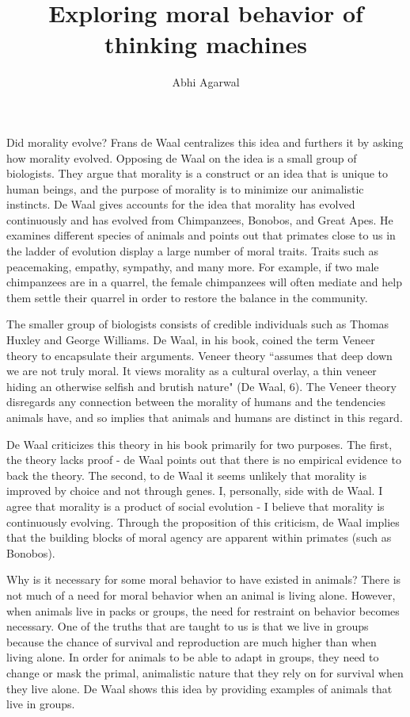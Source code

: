 \documentclass[11pt, oneside]{article}
\title{Exploring moral behavior of thinking machines}
\author{Abhi Agarwal}
\date{}
\begin{document}
\maketitle

\par Did morality evolve? Frans de Waal centralizes this idea and furthers it by asking how morality evolved. Opposing de Waal on the idea is a small group of biologists. They argue that morality is a construct or an idea that is unique to human beings, and the purpose of morality is to minimize our animalistic instincts. De Waal gives accounts for the idea that morality has evolved continuously and has evolved from Chimpanzees, Bonobos, and Great Apes. He examines different species of animals and points out that primates close to us in the ladder of evolution display a large number of moral traits. Traits such as peacemaking, empathy, sympathy, and many more. For example, if two male chimpanzees are in a quarrel, the female chimpanzees will often mediate and help them settle their quarrel in order to restore the balance in the community.
 
\par The smaller group of biologists consists of credible individuals such as Thomas Huxley and George Williams. De Waal, in his book, coined the term Veneer theory to encapsulate their arguments. Veneer theory ``assumes that deep down we are not truly moral. It views morality as a cultural overlay, a thin veneer hiding an otherwise selfish and brutish nature" (De Waal, 6). The Veneer theory disregards any connection between the morality of humans and the tendencies animals have, and so implies that animals and humans are distinct in this regard.
 
\par De Waal criticizes this theory in his book primarily for two purposes. The first, the theory lacks proof - de Waal points out that there is no empirical evidence to back the theory. The second, to de Waal it seems unlikely that morality is improved by choice and not through genes.
I, personally, side with de Waal. I agree that morality is a product of social evolution - I believe that morality is continuously evolving. Through the proposition of this criticism, de Waal implies that the building blocks of moral agency are apparent within primates (such as Bonobos).
 
\par Why is it necessary for some moral behavior to have existed in animals? There is not much of a need for moral behavior when an animal is living alone. However, when animals live in packs or groups, the need for restraint on behavior becomes necessary. One of the truths that are taught to us is that we live in groups because the chance of survival and reproduction are much higher than when living alone. In order for animals to be able to adapt in groups, they need to change or mask the primal, animalistic nature that they rely on for survival when they live alone. De Waal shows this idea by providing examples of animals that live in groups.  
 
\end{document}
